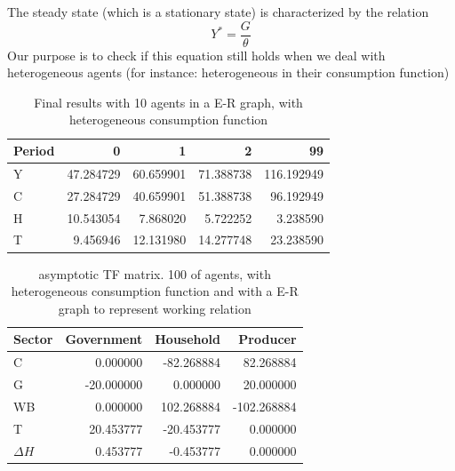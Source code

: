 \documentclass[10pt,a4paper]{article}
\begin{document}
The steady state (which is a stationary state) is characterized by the relation
\begin{equation}
Y^* = \frac{G}{\theta}
\end{equation}
Our purpose is to check if this equation still holds when we deal with heterogeneous agents (for instance: heterogeneous in their consumption function)


\begin{table}[h]
\centering
\begin{tabular}{lrrrr}
\toprule
Period &         0  &         1  &         2  &          99 \\
\midrule
Y &  47.284729 &  60.659901 &  71.388738 &  116.192949 \\
C  & 27.284729 & 40.659901 & 51.388738 &  96.192949 \\
H  &  10.543054 &   7.868020 &   5.722252 &   3.238590 \\
T  &  9.456946 & 12.131980 & 14.277748 &  23.238590 \\
\bottomrule
\end{tabular}
\caption{Final results with 10 agents in a E-R graph, with heterogeneous consumption function}
\end{table}

\begin{table}[h]
\centering
\begin{tabular}{lrrr}
\toprule
Sector &  Government &   Household &    Producer \\
\midrule
C  &    0.000000 &  -82.268884 &   82.268884 \\
G  &  -20.000000 &    0.000000 &   20.000000 \\
WB &    0.000000 &  102.268884 & -102.268884 \\
T  &   20.453777 &  -20.453777 &    0.000000 \\
$\Delta H$  &    0.453777 &   -0.453777 &    0.000000 \\
\bottomrule
\end{tabular}
\caption{asymptotic TF matrix. 100 of agents, with heterogeneous consumption function and with a E-R graph to represent working relation}
\end{table}
\end{document}
